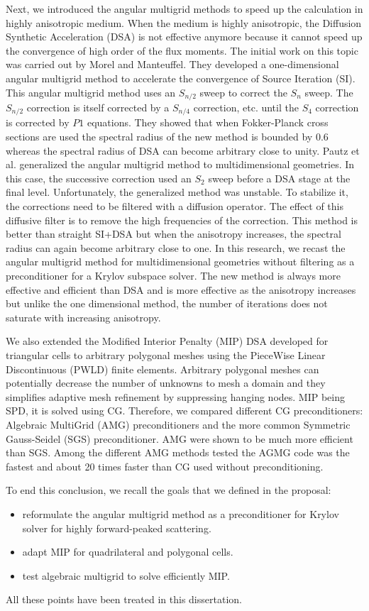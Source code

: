 Next, we introduced the angular multigrid methods to speed up
the calculation in highly anisotropic medium. When the medium is highly
anisotropic, the Diffusion Synthetic Acceleration (DSA) is not effective
anymore because it cannot speed up the convergence of high order of the 
flux moments. The initial work on this topic was carried out by Morel and Manteuffel. 
They developed a one-dimensional angular multigrid method  to
accelerate the convergence of Source Iteration (SI). This angular multigrid 
method uses an $S_{n/2}$ sweep to correct the $S_n$ sweep. The $S_{n/2}$ 
correction is itself corrected by a $S_{n/4}$ correction, etc. until the 
$S_4$ correction is corrected by $P1$ equations. They showed that when 
Fokker-Planck cross sections are used the spectral radius of the new 
method is bounded by 0.6 whereas the spectral radius of DSA can become 
arbitrary close to unity. Pautz et al. generalized the angular multigrid 
method to multidimensional geometries. In this case, the successive correction
used an $S_2$ sweep before a DSA stage at the final level. Unfortunately, 
the generalized method was unstable. To stabilize it, the corrections need to 
be filtered with a diffusion operator. The effect of this diffusive filter 
is to remove the high frequencies of the correction. This method is better 
than straight SI+DSA but when the
anisotropy increases, the spectral radius can again become arbitrary close to one.
In this research, we recast the angular multigrid method for
multidimensional geometries without filtering as a preconditioner for a Krylov
subspace solver. The new method is always more effective and efficient than 
DSA and is more effective as the anisotropy increases but unlike the one 
dimensional method, the number of iterations does not saturate with 
increasing anisotropy.

We also extended the Modified Interior Penalty (MIP) DSA
developed for triangular cells to arbitrary polygonal meshes using the
PieceWise Linear Discontinuous (PWLD) finite elements. Arbitrary polygonal
meshes can potentially decrease the number of unknowns to mesh a domain and
they simplifies adaptive mesh refinement by suppressing hanging nodes. MIP
being SPD, it is solved using CG. Therefore, we compared different
CG preconditioners: Algebraic MultiGrid (AMG) preconditioners and the more 
common Symmetric Gauss-Seidel (SGS) preconditioner. AMG were shown to be much 
more efficient than SGS. Among the different AMG methods tested the AGMG code 
was the fastest and about 20 times faster than CG used without preconditioning.

To end this conclusion, we recall the goals that we defined in the proposal:
\begin{itemize}
  \item reformulate the angular multigrid method as a preconditioner for
    Krylov solver for highly forward-peaked scattering.
  \item adapt MIP for quadrilateral and polygonal cells.
  \item test algebraic multigrid to solve efficiently MIP.
\end{itemize}
All these points have been treated in this dissertation.
